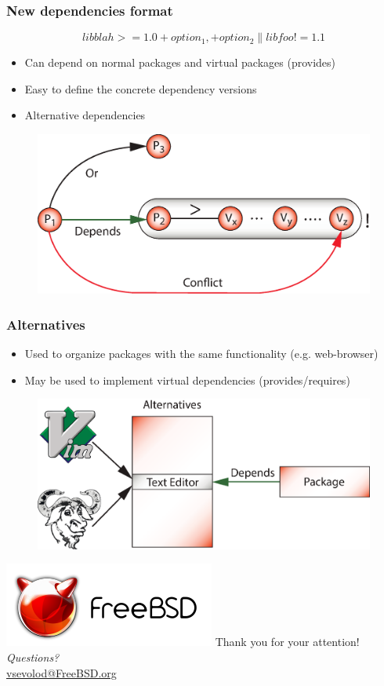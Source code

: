 \documentclass{beamer}
\begin{document}
\begin{frame}
\frametitle{New dependencies format}
\large{\[libblah >= 1.0 +option_1, +option_2 \| libfoo != 1.1\]}
\begin{itemize}
  \item Can depend on normal packages and virtual packages (provides)
  \item Easy to define the concrete dependency versions
  \item Alternative dependencies
\end{itemize}
\begin{figure}[h!]
  \centering
  \includegraphics[height=0.3\textheight]{q6.eps}
\end{figure}
\end{frame}

\begin{frame}
\frametitle{Alternatives}
\begin{itemize}
  \item Used to organize packages with the same functionality (e.g.
  web-browser)
  \item May be used to implement virtual dependencies (provides/requires)
\end{itemize}
\begin{figure}[h!]
  \centering
  \includegraphics[height=0.4\textheight]{q7.eps}
\end{figure}
\end{frame}

\begin{frame}
\begin{center}
\includegraphics{logo.pdf}
{\Large Thank you for your attention!} \\
\emph{Questions?} \\[4pt]
\url{vsevolod@FreeBSD.org}
\end{center}
\end{frame}
\end{document}
